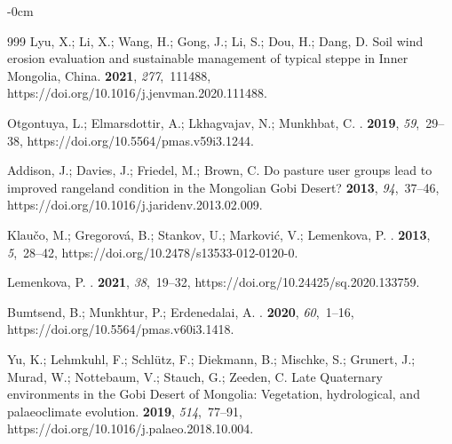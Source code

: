 \documentclass[geosciences,article,accept,pdftex,oneauthor]{Definitions/mdpi}
\begin{document}
\begin{adjustwidth}{-\extralength}{0cm}
\begin{thebibliography}{999}
Lyu, X.; Li, X.; Wang, H.; Gong, J.; Li, S.; Dou, H.; Dang, D.
\newblock Soil wind erosion evaluation and sustainable management of typical
  steppe in Inner Mongolia, China.
 {\bf 2021}, {\em
  277},~111488, https://doi.org/10.1016/j.jenvman.2020.111488.

Otgontuya, L.; Elmarsdottir, A.; Lkhagvajav, N.; Munkhbat, C.
.
 {\bf 2019},
  {\em 59},~29--38, https://doi.org/10.5564/pmas.v59i3.1244.

Addison, J.; Davies, J.; Friedel, M.; Brown, C.
\newblock Do pasture user groups lead to improved rangeland condition in the
  Mongolian Gobi Desert?
 {\bf 2013}, {\em 94},~37--46, https://doi.org/10.1016/j.jaridenv.2013.02.009.

Klaučo, M.; Gregorová, B.; Stankov, U.; Marković, V.; Lemenkova, P.
.
 {\bf 2013}, {\em 5},~28--42, https://doi.org/10.2478/s13533-012-0120-0.

Lemenkova, P.
.
 {\bf 2021}, {\em 38},~19--32, https://doi.org/10.24425/sq.2020.133759.

Bumtsend, B.; Munkhtur, P.; Erdenedalai, A.
.
 {\bf 2020},
  {\em 60},~1--16, https://doi.org/10.5564/pmas.v60i3.1418.

Yu, K.; Lehmkuhl, F.; Schlütz, F.; Diekmann, B.; Mischke, S.; Grunert, J.;
  Murad, W.; Nottebaum, V.; Stauch, G.; Zeeden, C.
\newblock Late Quaternary environments in the Gobi Desert of Mongolia:
  Vegetation, hydrological, and palaeoclimate evolution.
 {\bf 2019},
  {\em 514},~77--91, https://doi.org/10.1016/j.palaeo.2018.10.004.


\end{thebibliography}
\end{adjustwidth}
\end{document}
